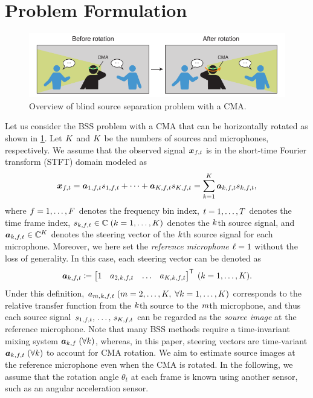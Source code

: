 \documentclass[sip,biber]{now-journal}
\begin{document}
\section{Problem Formulation}\label{sec:problem}
\begin{figure}[t]
  \centering
  \includegraphics{figures/diagrams/bss.pdf}%
  \caption{Overview of blind source separation problem with a CMA.}%
  \label{fig:bss}
\end{figure}
Let us consider the BSS problem with a CMA that can be horizontally rotated as shown in \cref{fig:bss}.
Let $K$ and $K$ be the numbers of sources and microphones, respectively.
We assume that the observed signal $\Obs _{\ft}$ is in the short-time Fourier transform (STFT) domain modeled as
\begin{equation}
  \Obs _{\ft} = \steer _{1,\ft} \sig _{1,\ft} + \dots + \steer _{\Src,\ft} \sig _{\Src,\ft} = \sum _{\src=1} ^{\Src} \steer _{\src,\ft} \sig _{\src,\ft},\label{eq:mix}
\end{equation}
where $f = 1, \dots, F$ denotes the frequency bin index,
$t = 1, \dots, T$ denotes the time frame index,
$\sig _{\src,\ft} \in \C\; (\src = 1, \dots, \Src)$ denotes the $k$th source signal,
and $\steer _{\src,\ft} \in \C ^{\Mic}$ denotes the steering vector of the $k$th source signal for each microphone.
Moreover, we here set the \emph{reference microphone} $\ell = 1$ without the loss of generality.
In this case, each steering vector can be denoted as
\begin{equation}
  \steer _{\src,\ft} \coloneqq \begin{bmatrix} 1 & \str _{2,\src,\ft} & \dots & \str _{\Mic,\src,\ft} \end{bmatrix} ^{\top}\; (\src = 1, \dots, \Src).
\end{equation}
Under this definition, $\str _{\mic,\src,\ft} \; (\mic = 2, \dots, \Mic,\; \forall \src = 1, \dots, \Src)$ corresponds to the relative transfer function from the $k$th source to the $m$th microphone, and thus each source signal $\sig _{1,\ft},\, \dots,\, \sig _{\Src,\ft}$ can be regarded as the \emph{source image} at the reference microphone.
Note that many BSS methods require a time-invariant mixing system $\bm{a} _{k,f}\; (\forall k)$,
whereas, in this paper, steering vectors are time-variant $\steer _{\src,\ft}\; (\forall \src)$ to account for CMA rotation.
We aim to estimate source images at the reference microphone even when the CMA is rotated.
In the following, we assume that the rotation angle $\theta_t$ at each frame is known using another sensor, such as an angular acceleration sensor.
\end{document}
